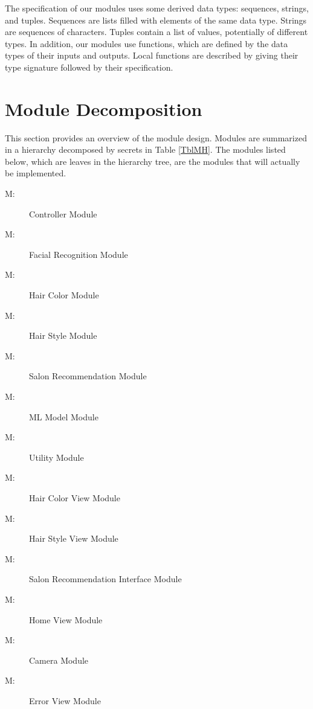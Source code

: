 \documentclass[12pt, titlepage]{article}
\newcounter{mnum}
\newcommand{\mthemnum}{M\themnum}
\begin{document}
\noindent
The specification of our modules uses some derived data types: sequences, strings, and tuples. Sequences are lists filled with elements of the same data type. Strings are sequences of characters. Tuples contain a list of values, potentially of different types. In addition, our modules use functions, which are defined by the data types of their inputs and outputs. Local functions are described by giving their type signature followed by their specification.

\section{Module Decomposition}

This section provides an overview of the module design. Modules are summarized
in a hierarchy decomposed by secrets in Table \ref{TblMH}. The modules listed
below, which are leaves in the hierarchy tree, are the modules that will
actually be implemented.

\begin{description}
\item [ \mthemnum \label{mHH}:] Controller Module
\item [ \mthemnum \label{mHH}:] Facial Recognition Module
\item [ \mthemnum \label{mHH}:] Hair Color Module
\item [ \mthemnum \label{mHH}:] Hair Style Module
\item [ \mthemnum \label{mHH}:] Salon Recommendation Module
\item [ \mthemnum \label{mHH}:] ML Model Module
\item [ \mthemnum \label{mHH}:] Utility Module
\item [ \mthemnum \label{mHH}:] Hair Color View Module
\item [ \mthemnum \label{mHH}:] Hair Style View Module
\item [ \mthemnum \label{mHH}:] Salon Recommendation Interface Module
\item [ \mthemnum \label{mHH}:] Home View Module
\item [ \mthemnum \label{mHH}:] Camera Module
\item [ \mthemnum \label{mHH}:] Error View Module
\end{description}
\end{document}
